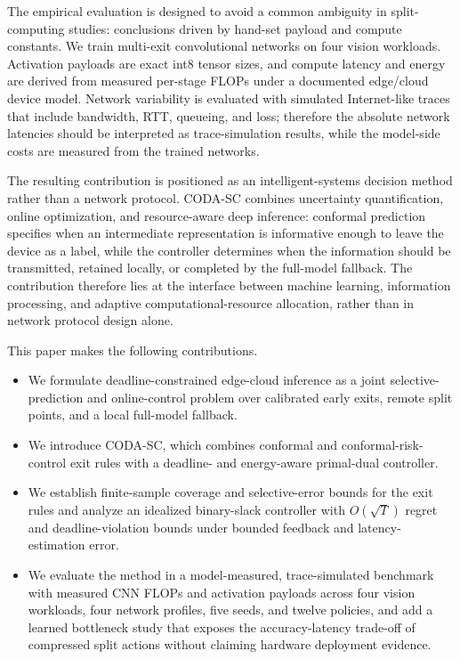 \documentclass[11pt]{article}
\begin{document}
The empirical evaluation is designed to avoid a common ambiguity in
split-computing studies: conclusions driven by hand-set payload and compute
constants. We train multi-exit convolutional networks on four vision workloads.
Activation payloads are exact int8 tensor sizes, and compute latency and energy
are derived from measured per-stage FLOPs under a documented edge/cloud device
model. Network variability is evaluated with simulated Internet-like traces that
include bandwidth, RTT, queueing, and loss; therefore the absolute network
latencies should be interpreted as trace-simulation results, while the model-side
costs are measured from the trained networks.

The resulting contribution is positioned as an intelligent-systems decision
method rather than a network protocol. CODA-SC combines uncertainty
quantification, online optimization, and resource-aware deep inference:
conformal prediction specifies when an intermediate representation is informative
enough to leave the device as a label, while the controller determines when the
information should be transmitted, retained locally, or completed by the
full-model fallback. The contribution therefore lies at the interface between
machine learning, information processing, and adaptive computational-resource
allocation, rather than in network protocol design alone.

This paper makes the following contributions.

\begin{itemize}
    \item We formulate deadline-constrained edge-cloud inference as a joint
    selective-prediction and online-control problem over calibrated early exits,
    remote split points, and a local full-model fallback.
    \item We introduce CODA-SC, which combines conformal and conformal-risk-control
    exit rules with a deadline- and energy-aware primal-dual controller.
    \item We establish finite-sample coverage and selective-error bounds for the
    exit rules and analyze an idealized binary-slack controller with
    $O(\sqrt{T})$ regret and deadline-violation bounds under bounded feedback and
    latency-estimation error.
    \item We evaluate the method in a model-measured, trace-simulated benchmark
    with measured CNN FLOPs and activation payloads across four vision workloads,
    four network profiles, five seeds, and twelve policies, and add a learned
    bottleneck study that exposes the accuracy-latency trade-off of compressed
    split actions without claiming hardware deployment evidence.
\end{itemize}
\end{document}
